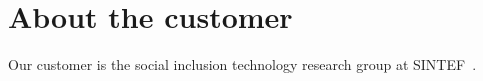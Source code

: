 \section{About the customer}

Our customer is the social inclusion technology research group at SINTEF~\cite{sintef}.